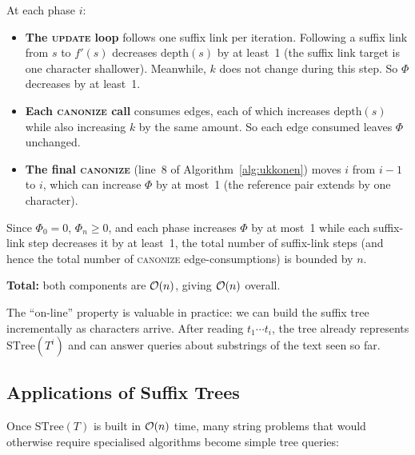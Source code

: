 \begin{formaldetails}
\medskip
At each phase $i$:
\begin{itemize}[nosep]
  \item \textbf{The \textsc{update} loop} follows one suffix link per
        iteration.
        Following a suffix link from $s$ to $f'(s)$ decreases
        $\mathrm{depth}(s)$ by at least~1 (the suffix link target
        is one character shallower).
        Meanwhile, $k$ does not change during this step.
        So $\Phi$ decreases by at least~1.

  \item \textbf{Each \textsc{canonize} call} consumes edges, each of
        which increases $\mathrm{depth}(s)$ while also increasing $k$
        by the same amount.
        So each edge consumed leaves $\Phi$ unchanged.

  \item \textbf{The final \textsc{canonize}} (line~8 of
        Algorithm~\ref{alg:ukkonen}) moves $i$ from $i-1$ to $i$,
        which can increase $\Phi$ by at most~1 (the reference pair
        extends by one character).
\end{itemize}

Since $\Phi_0 = 0$, $\Phi_n \ge 0$, and each phase increases $\Phi$
by at most~1 while each suffix-link step decreases it by at least~1,
the total number of suffix-link steps (and hence the total number of
\textsc{canonize} edge-consumptions) is bounded by $n$.

\medskip
\textbf{Total:} both components are $\mathcal{O}\!\left(n\right)$, giving
$\mathcal{O}\!\left(n\right)$ overall.
\end{formaldetails}

\begin{remark}
  The ``on-line'' property is valuable in practice: we can build the
  suffix tree incrementally as characters arrive.
  After reading $t_1 \cdots t_i$, the tree already represents
  $\mathrm{STree}(T^i)$ and can answer queries about substrings
  of the text seen so far.
\end{remark}

\subsection{Applications of Suffix Trees}

Once $\mathrm{STree}(T)$ is built in $\mathcal{O}\!\left(n\right)$ time, many string
problems that would otherwise require specialised algorithms become
simple tree queries:


